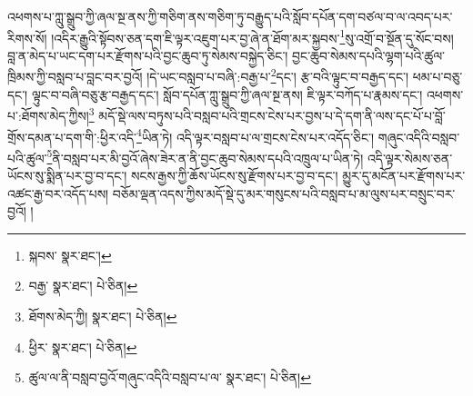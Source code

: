 འཕགས་པ་ཀླུ་སྒྲུབ་ཀྱི་ཞལ་སྔ་ནས་ཀྱི་གཅིག་ནས་གཅིག་ཏུ་བརྒྱུད་པའི་སློབ་དཔོན་དག་བཙལ་བ་ལ་འབད་པར་རིགས་སོ། །འདིར་རྒྱུའི་སྟོབས་ཅན་དག་ཇི་ལྟར་འཇུག་པར་བྱ་ཞེ་ན་ཐོག་མར་སྐྱབས་\footnote{སྐབས་  སྣར་ཐང་། }སུ་འགྲོ་བ་སྔོན་དུ་སོང་བས། བླ་ན་མེད་པ་ཡང་དག་པར་རྫོགས་པའི་བྱང་ཆུབ་ཏུ་སེམས་བསྐྱེད་ཅིང་། བྱང་ཆུབ་སེམས་དཔའི་ལྷག་པའི་ཚུལ་ཁྲིམས་ཀྱི་བསླབ་པ་བླང་བར་བྱའོ། །དེ་ཡང་བསླབ་པ་བཞི་:བརྒྱ་པ་\footnote{བརྒྱ་  སྣར་ཐང་།  པེ་ཅིན། }དང་། རྩ་བའི་ལྟུང་བ་བརྒྱད་དང་། ཕམ་པ་བཅུ་དང་། ལྟུང་བ་བཞི་བཅུ་རྩ་བརྒྱད་དང་། སློབ་དཔོན་ཀླུ་སྒྲུབ་ཀྱི་ཞལ་སྔ་ནས། ཇི་ལྟར་བཀོད་པ་རྣམས་དང་། འཕགས་པ་:ཐོགས་མེད་ཀྱིས།\footnote{ཐོགས་མེད་ཀྱི།  སྣར་ཐང་།  པེ་ཅིན། } མདོ་སྡེ་ལས་བཏུས་པའི་བསླབ་པའི་གྲངས་ངེས་པར་བྱས་པ་དེ་དག་ནི་ལས་དང་པོ་པ་བློ་གྲོས་དམན་པ་དག་གི་:ཕྱིར་འདི་\footnote{ཕྱིར་  སྣར་ཐང་།  པེ་ཅིན། }ཡིན་ཏེ། འདི་ལྟར་བསླབ་པ་ལ་གྲངས་ངེས་པར་འདོད་ཅིང་། གཞུང་འདིའི་བསླབ་པའི་ཚུལ་\footnote{ཚུལ་ལ་ནི་བསླབ་བྱའོ་གཞུང་འདིའི་བསླབ་པ་ལ་  སྣར་ཐང་།  པེ་ཅིན། }ནི་བསླབ་པར་མི་བྱའོ་ཞེས་ཟེར་ན་ནི་བྱང་ཆུབ་སེམས་དཔའི་འཁྲུལ་པ་ཡིན་ཏེ། འདི་ལྟར་སེམས་ཅན་ཡོངས་སུ་སྨིན་པར་བྱ་བ་དང་། སངས་རྒྱས་ཀྱི་ཆོས་ཡོངས་སུ་རྫོགས་པར་བྱ་བ་དང་། མྱུར་དུ་མངོན་པར་རྫོགས་པར་འཚང་རྒྱ་བར་འདོད་པས། བཅོམ་ལྡན་འདས་ཀྱིས་མདོ་སྡེ་དུ་མར་གསུངས་པའི་བསླབ་པ་མ་ལུས་པར་བསྲུང་བར་བྱའོ། །
